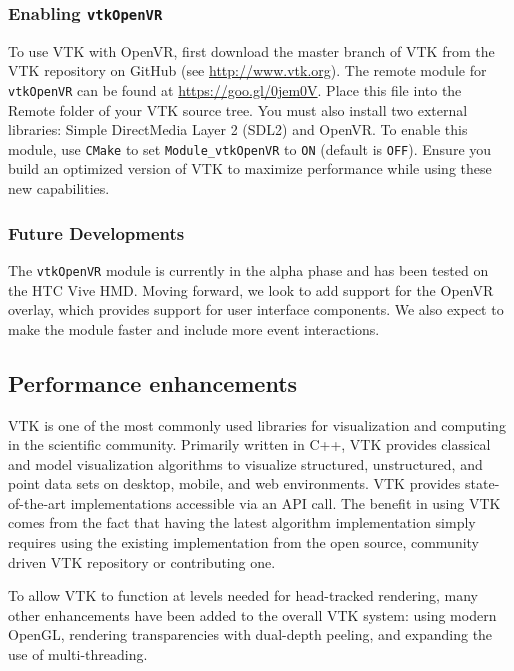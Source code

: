 \subsubsection{Enabling \texttt{vtkOpenVR}}

To use VTK with OpenVR, first download the master branch of VTK from the VTK
repository on GitHub (see \url{http://www.vtk.org}).
The remote module for \texttt{vtkOpenVR} can be found at
\url{https://goo.gl/0jem0V}. Place this file into the Remote folder of your VTK source tree.
You must also install two external libraries: Simple DirectMedia Layer 2 (SDL2) and OpenVR.
To enable this module, use \texttt{CMake} to set \texttt{Module\_vtkOpenVR} to \texttt{ON} (default is \texttt{OFF}).
Ensure you build an optimized version of VTK to maximize performance while using these new capabilities.

\subsubsection{Future Developments}

The \texttt{vtkOpenVR}  module is currently in the alpha phase and has been tested on the HTC Vive HMD.
Moving forward, we look to add support for the OpenVR overlay, which provides support for user interface components.
We also expect to make the module faster and include more event interactions. 

\subsection{Performance enhancements}

VTK is one of the most commonly used libraries for visualization and computing in the scientific community.
Primarily written in C++, VTK provides classical and model visualization algorithms to visualize structured, unstructured, and point data sets on desktop, mobile, and web environments.
VTK provides state-of-the-art implementations accessible via an API call.
The benefit in using VTK comes from the fact that having the latest algorithm implementation simply requires using the existing implementation from the
open source, community driven VTK repository or contributing one.

To allow VTK to function at levels needed for head-tracked rendering,
many other enhancements have been added to the overall VTK system:
using modern OpenGL,
rendering transparencies with dual-depth peeling, and
expanding the use of multi-threading.


